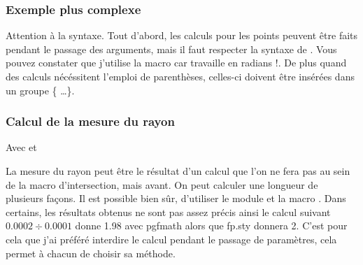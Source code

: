 \newpage
\subsubsection{Exemple plus complexe}
Attention à la syntaxe. Tout d'abord, les calculs pour les points peuvent être faits pendant le passage des arguments, mais il faut respecter la syntaxe de . Vous pouvez constater que j'utilise la macro   car  travaille en radians !. De plus quand des calculs nécéssitent l'emploi de parenthèses, celles-ci doivent être insérées dans un groupe \TEX \{ \dots \}.


\begin{center}
\begin{tkzexample}[vbox]
\end{tkzexample} 
\end{center}

\newpage
\subsubsection{Calcul de la mesure du rayon} 
 Avec  et    
 
La mesure du rayon peut être le résultat d'un calcul que l'on ne fera pas au sein de la macro d'intersection, mais avant. 
On peut calculer une longueur de plusieurs façons. Il est possible bien sûr,
 d'utiliser le module  et la macro . Dans certains, les résultats obtenus ne sont pas assez précis ainsi le calcul suivant $0.0002 \div 0.0001$ donne 1.98 avec pgfmath alors que fp.sty donnera 2. C'est pour cela que j'ai préféré interdire le calcul pendant le passage de paramètres, cela permet à chacun de choisir sa méthode.
   
\begin{tkzexample}[latex=7cm]
\end{tkzexample}

